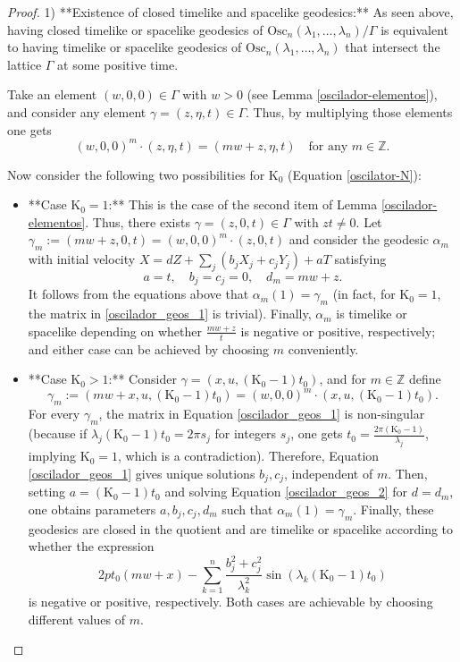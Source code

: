 \documentclass[12pt]{amsart}
\theoremstyle{plain}
\theoremstyle{definition}
\theoremstyle{remark}
\begin{document}
		
\begin{proof}

	1) **Existence of closed timelike and spacelike geodesics:** As seen above, having closed timelike or spacelike geodesics of \( \text{Osc}_n(\lambda_1, \ldots, \lambda_n)/\Gamma \) is equivalent to having timelike or spacelike geodesics of \( \text{Osc}_n(\lambda_1, \ldots, \lambda_n) \) that intersect the lattice \( \Gamma \) at some positive time.
	
	Take an element \( (w,0,0) \in \Gamma \) with \( w>0 \) (see Lemma \ref{oscilador-elementos}), and consider any element \( \gamma = (z, \eta, t) \in \Gamma \). Thus, by multiplying those elements one gets  
	\[
	(w,0,0)^m \cdot (z, \eta, t) = (mw + z, \eta, t) \quad \text{for any } m \in \mathbb{Z}.
	\]
	
	Now consider the following two possibilities for \( \mathrm{K_0} \) (Equation \eqref{oscilator-N}):
	
	\begin{itemize}
		\item **Case \( \mathrm{K_0} = 1 \):** This is the case of the second item of Lemma \ref{oscilador-elementos}. Thus, there exists \( \gamma = (z, 0, t) \in \Gamma \) with \( z t \neq 0 \). Let \( \gamma_m := (mw + z, 0, t) = (w,0,0)^m \cdot (z,0,t) \) and consider the geodesic \( \alpha_m \) with initial velocity \( X = d Z + \sum_j (b_j X_j + c_j Y_j) + a T \) satisfying 
		\[
		a = t, \quad b_j = c_j = 0, \quad d_m = mw + z.
		\]
		It follows from the equations above that \( \alpha_m(1) = \gamma_m \) (in fact, for \( \mathrm{K_0} = 1 \), the matrix in \eqref{oscilador_geos_1} is trivial). Finally, \( \alpha_m \) is timelike or spacelike depending on whether \( \frac{mw + z}{t} \) is negative or positive, respectively; and either case can be achieved by choosing \( m \) conveniently.
	
		\item **Case \( \mathrm{K_0} > 1 \):** Consider \( \gamma = (x, u, (\mathrm{K_0}-1) t_0) \), and for \( m \in \mathbb{Z} \) define 
		\[
		\gamma_m := (mw + x, u, (\mathrm{K_0}-1) t_0) = (w,0,0)^m \cdot (x,u,(\mathrm{K_0}-1) t_0).
		\]
		For every \( \gamma_m \), the matrix in Equation \eqref{oscilador_geos_1} is non-singular (because if \( \lambda_j (\mathrm{K_0}-1) t_0 = 2\pi s_j \) for integers \( s_j \), one gets \( t_0 = \frac{2\pi (\mathrm{K_0}-1)}{\lambda_j} \), implying \( \mathrm{K_0} = 1 \), which is a contradiction). Therefore, Equation \eqref{oscilador_geos_1} gives unique solutions \( b_j, c_j \), independent of \( m \). Then, setting \( a = (\mathrm{K_0}-1) t_0 \) and solving Equation \eqref{oscilador_geos_2} for \( d = d_m \), one obtains parameters \( a, b_j, c_j, d_m \) such that \( \alpha_m(1) = \gamma_m \). Finally, these geodesics are closed in the quotient and are timelike or spacelike according to whether the expression
		\[
		2 p t_0 (mw + x) - \sum_{k=1}^{n} \frac{b_j^2 + c_j^2}{\lambda_k^2} \sin(\lambda_k (\mathrm{K_0}-1) t_0)
		\]
		is negative or positive, respectively. Both cases are achievable by choosing different values of \( m \).
	\end{itemize}
	

\end{proof}
\end{document}

